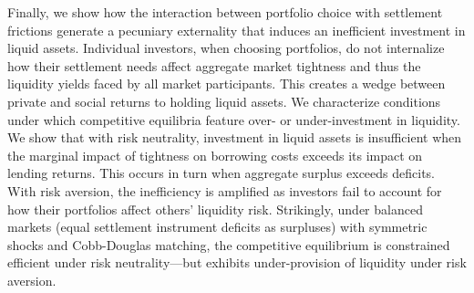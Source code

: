 

Finally, we show how the interaction between portfolio choice with settlement frictions generate a pecuniary externality that induces an inefficient investment in liquid assets.
Individual investors, when choosing portfolios, do not internalize
how their settlement needs affect aggregate market tightness and thus
the liquidity yields faced by all market participants. This creates
a wedge between private and social returns to holding liquid assets.
We characterize conditions under which competitive equilibria feature
over- or under-investment in liquidity. We show that with risk neutrality, investment in liquid assets is insufficient when the marginal impact of tightness on borrowing costs exceeds its impact on lending returns. This occurs in turn when aggregate surplus exceeds deficits. With risk
aversion, the inefficiency is amplified as investors fail to account
for how their portfolios affect others' liquidity risk. Strikingly,
under balanced markets (equal settlement instrument deficits as surpluses)
with symmetric shocks and Cobb-Douglas matching, the competitive equilibrium
is constrained efficient under risk neutrality---but exhibits under-provision
of liquidity under risk aversion. 


